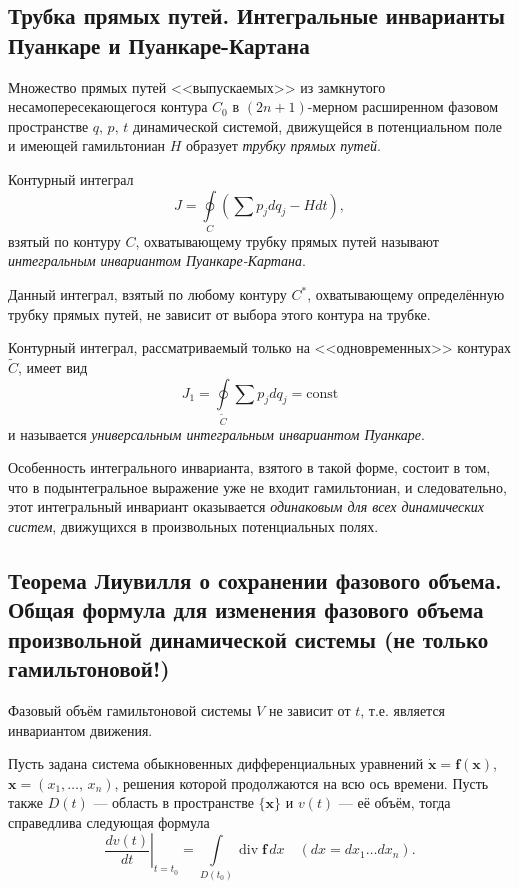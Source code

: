 \documentclass[a4paper]{article}
\begin{document}
\subsection{Трубка прямых путей. Интегральные инварианты Пуанкаре и
Пуанкаре-Картана}
\begin{dfn}
	Множество прямых путей <<выпускаемых>> из замкнутого
	несамопересекающегося контура $C_0$ в $(2n+1)$-мерном расширенном
	фазовом пространстве $q,\,p,\,t$ динамической системой, движущейся
	в потенциальном поле и имеющей гамильтониан $H$ образует \emph{трубку
	прямых путей}.
\end{dfn}
\begin{dfn}
	Контурный интеграл
	\[
		J = \oint\limits_C \left(\sum p_j dq_j - Hdt\right),
	\] 
	 взятый по контуру $C$, охватывающему трубку прямых путей называют
	 \emph{интегральным инвариантом Пуанкаре-Картана}.
\end{dfn}
Данный интеграл, взятый по любому контуру $C^*$, охватывающему определённую
трубку прямых путей, не зависит от выбора этого контура на трубке.
\begin{dfn}
	Контурный интеграл, рассматриваемый только на <<одновременных>>
	контурах $\tilde{C}$, имеет  вид
	\[
		J_1 = \oint\limits_{\tilde{C}} \sum p_j dq_j=\mathrm{const}
	\]
	и называется \emph{универсальным интегральным инвариантом Пуанкаре}.
\end{dfn}
Особенность интегрального инварианта, взятого в такой форме, состоит в том, что
в подынтегральное выражение уже не входит гамильтониан, и следовательно, этот
интегральный инвариант оказывается \emph{одинаковым для всех динамических
систем}, движущихся в произвольных потенциальных полях.
\subsection{Теорема Лиувилля о сохранении фазового объема. Общая формула для
изменения фазового объема произвольной динамической системы (не только
гамильтоновой!)}
\begin{thm}[Лиувилля]
	Фазовый объём гамильтоновой системы $V$ не зависит от $t$,
	т.\:е. является инвариантом движения.
\end{thm}
Пусть задана система обыкновенных дифференциальных уравнений 
$\dot{\mathbf{x}}=\mathbf{f}(\mathbf{x})$, $\mathbf{x}=(x_1,\ldots,\,x_n)$,
решения которой продолжаются на всю ось времени. Пусть также $D(t)$ ---
область в пространстве $\{\mathbf{x}\}$ и $v(t)$ --- её  объём, тогда
справедлива  следующая формула
\[
	\left.\frac{dv(t)}{dt}\right|_{t=t_0}= \int\limits_{D(t_0)}
		\operatorname{div}
		\mathbf{f}\,dx  \quad(dx=dx_1 \ldots dx_n)
.\] 
\end{document}

